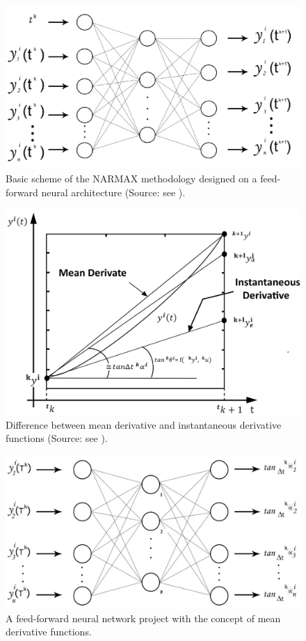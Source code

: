 \documentclass[journal,article,submit,pdftex,moreauthors]{Definitions/mdpi}
\begin{document}
\begin{figure}[htb]
	\centering
	\includegraphics[scale=0.35]{Definitions/figure1.png}
	\caption{Basic scheme of the NARMAX methodology designed on a feed-forward neural architecture (Source: see \cite{ref5, ref6}).}	
	\label{fig1}
\end{figure}

\begin{figure}[htb]
	\centering
	\includegraphics[scale=0.17]{Definitions/figure2.png}
	\caption{Difference between mean derivative and instantaneous derivative functions (Source: see \cite{ref7, ref8}).}
	\label{fig2}
\end{figure}

\begin{figure}[htb]
\centering
\includegraphics[scale=0.46]{Definitions/figure3.png}
\caption{A feed-forward neural network project with the concept of mean derivative functions.}
\label{fig3}
\end{figure}
\end{document}
